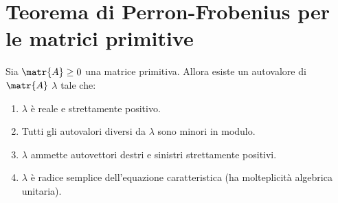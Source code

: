 \documentclass[\main/main.tex]{subfiles}
\begin{document}
\section{Teorema di Perron-Frobenius per le matrici primitive}
\begin{theorem}
  Sia \(\matr{A} \geq 0\) una matrice primitiva. Allora esiste un autovalore di \(\matr{A}\) \(\lambda \) tale che:
  \begin{enumerate}
    \item \(\lambda \) è reale e strettamente positivo.
    \item Tutti gli autovalori diversi da \(\lambda \) sono minori in modulo.
    \item \(\lambda \) ammette autovettori destri e sinistri strettamente positivi.
    \item \(\lambda \) è radice semplice dell'equazione caratteristica (ha molteplicità algebrica unitaria).
  \end{enumerate}
\end{theorem}
\end{document}
